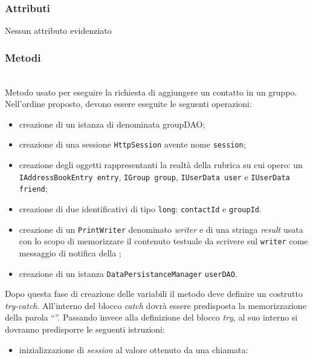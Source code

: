 \subsubsection*{Attributi}

Nessun attributo evidenziato

\subsubsection*{Metodi}

\begin{description}
	\item{}\\	
	Metodo usato per eseguire la richiesta di aggiungere un contatto in un gruppo. Nell'ordine proposto, devono essere eseguite le seguenti operazioni:
	\begin{itemize}
		\item creazione di un istanza di  denominata groupDAO;
		\item creazione di una sessione \texttt{HttpSession} avente nome \texttt{session};
		\item creazione degli oggetti rappresentanti la realtà della rubrica su cui opero: un \texttt{IAddressBookEntry entry}, \texttt{IGroup group}, \texttt{IUserData user} e \texttt{IUserData friend};
		\item creazione di due identificativi di tipo \texttt{long}: \texttt{contactId} e \texttt{groupId}.
		\item creazione di un \texttt{PrintWriter} denominato \textit{writer} e di una stringa \textit{result} usata con lo scopo di memorizzare il contenuto testuale da scrivere sul \texttt{writer} come messaggio di notifica della ;
		\item creazione di un istanza \texttt{DataPersistanceManager} \texttt{userDAO}.
	\end{itemize}
	Dopo questa fase di creazione delle variabili il metodo deve definire un costrutto \textit{try-catch}. All'interno del blocco \textit{catch} dovrà essere predisposta la memorizzazione della parola ``''. Passando invece alla definizione del blocco \textit{try}, al suo interno si dovranno predisporre le seguenti istruzioni:
	\begin{itemize}
		\item inizializzazione di \textit{session} al valore ottenuto da una chiamata:\\

\end{itemize}
\end{description}
